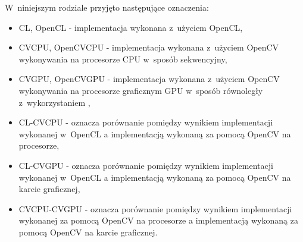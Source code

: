 W~niniejszym rodziale przyjęto następujące oznaczenia:
\begin{itemize}
\item CL, OpenCL - implementacja wykonana z~użyciem OpenCL,
\item CVCPU, OpenCVCPU - implementacja wykonana z~użyciem OpenCV wykonywania na procesorze CPU w~sposób sekwencyjny,
\item CVGPU, OpenCVGPU - implementacja wykonana z~użyciem OpenCV wykonywania na procesorze graficznym GPU w~sposób równoległy z~wykorzystaniem ,
\item CL-CVCPU - oznacza porównanie pomiędzy wynikiem implementacji wykonanej w~OpenCL a implementacją wykonaną za pomocą OpenCV na procesorze,
\item CL-CVGPU - oznacza porównanie pomiędzy wynikiem implementacji wykonanej w~OpenCL a implementacją wykonaną za pomocą OpenCV na karcie graficznej,
\item CVCPU-CVGPU - oznacza porównanie pomiędzy wynikiem implementacji wykonanej za pomocą OpenCV na procesorze a implementacją wykonaną za pomocą OpenCV na karcie graficznej.
\end{itemize}
